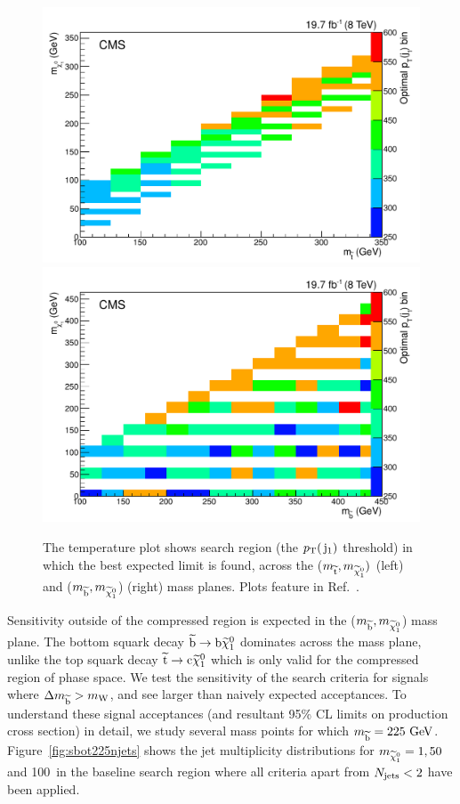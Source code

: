 \begin{figure}[!Hhtb]
  \begin{center}
  \includegraphics[scale=0.39]{Figures/sus13009/limitplots/optimal_stop_jet1pT.pdf}
  \includegraphics[scale=0.39]{Figures/sus13009/limitplots/optimal_sbottom_jet1pT.pdf}
  \caption{The temperature plot shows search region (the $p_{\text{T}}(\,\mathrm{j}_1)$ threshold) in which the best expected limit is found, across the ($m_{\widetilde{{\rm t}}}, m_{\widetilde{\chi}^{0}_{1}})$ (left) and ($m_{\widetilde{{\rm b}}},m_{\widetilde{\chi}^{0}_{1}}$) (right) mass planes. Plots feature in Ref.~\cite{sus14001}.}
  \label{fig:optimalJ1}
  \end{center}
\end{figure}

Sensitivity outside of the compressed region is expected in the ($m_{\widetilde{{\rm b}}}, m_{\widetilde{\chi}^{0}_{1}}$) mass plane. 
The bottom squark decay $\widetilde{{\rm b}} \rightarrow {\rm b} \widetilde{\chi}^{0}_{1}$ dominates across the mass plane, 
unlike the top squark decay $\widetilde{{\rm t}} \rightarrow {\rm c} \widetilde{\chi}^{0}_{1}$ which is only valid for the compressed region of phase space.
We test the sensitivity of the search criteria for signals where $\Delta m_{\widetilde{{\rm b}}}>m_{\mathrm{W}}$, and see larger than naively expected acceptances. 
To understand these signal acceptances (and resultant 95\% CL limits on production cross section) in detail, we study several mass points for which $m_{\widetilde{{\rm b}}}=225~\mathrm{GeV}$. 
Figure~\ref{fig:sbot225njets} shows the jet multiplicity distributions for $m_{\widetilde{\chi}^{0}_{1}}=1,50$ and 100~\GeV in the baseline search region where all criteria apart from $N_{\text{jets}}<2$ have been applied.  

